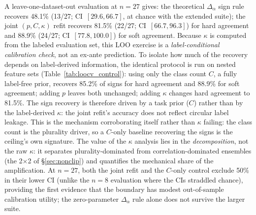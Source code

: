 \documentclass[a4paper,fleqn]{cas-sc}
\begin{document}
A leave-one-dataset-out evaluation at $n{=}27$ gives:
the theoretical $\Delta_\alpha$ sign rule recovers 48.1\% (13/27; CI~$[29.6,66.7]$, at chance with the extended suite);
the joint $(p,C,\kappa)$ refit recovers 81.5\% (22/27; CI~$[66.7,96.3]$) for hard agreement and 88.9\% (24/27; CI~$[77.8,100.0]$) for soft agreement.
Because $\kappa$ is computed from the labeled evaluation set, this LOO exercise is a \emph{label-conditional calibration check}, not an ex-ante prediction.
To isolate how much of the recovery depends on label-derived information, the identical protocol is run on nested feature sets (Table~\ref{tab:loocv_control}): using only the class count $C$, a fully label-free prior, recovers 85.2\% of signs for hard agreement and 88.9\% for soft agreement; adding $p$ leaves both unchanged; adding $\kappa$ changes hard agreement to 81.5\%.
The sign recovery is therefore driven by a task prior ($C$) rather than by the label-derived $\kappa$: the joint refit's accuracy does not reflect circular label leakage.
This is the mechanism corroborating itself rather than $\kappa$ failing: the class count is the plurality driver, so a $C$-only baseline recovering the signs is the ceiling's own signature.
The value of the $\kappa$ analysis lies in the \emph{decomposition}, not the raw $\kappa$: it separates plurality-dominated from correlation-dominated ensembles (the 2$\times$2 of \S\ref{sec:nonclip}) and quantifies the mechanical share of the amplification.
At $n{=}27$, both the joint refit and the $C$-only control exclude 50\% in their lower CI (unlike the $n{=}8$ evaluation where the CIs straddled chance), providing the first evidence that the boundary has modest out-of-sample calibration utility; the zero-parameter $\Delta_\alpha$ rule alone does not survive the larger suite.
\end{document}
